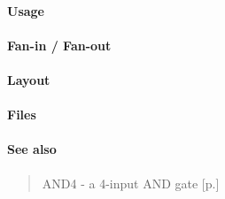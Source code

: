 \paragraph{Usage}

\paragraph{Fan-in / Fan-out}

\paragraph{Layout}

\paragraph{Files}

\paragraph{See also}
\begin{quote}
    AND4 - a 4-input AND gate [p.\pageref{EQ2}]
\end{quote}

